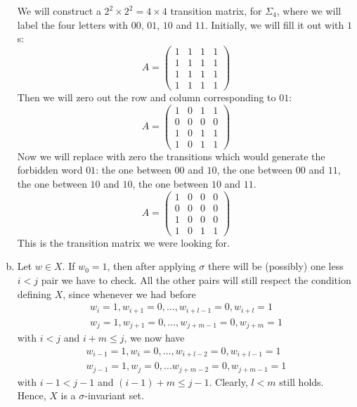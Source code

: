 \begin{problem}
\begin{enumerate}[a)]
    We will construct a \(2^2 \times 2^2 = 4 \times 4\) transition matrix, for \(\Sigma_4\), where we will label the four letters with \(00\), \(01\), \(10\) and \(11\). Initially, we will fill it out with \(1\)s:
    \[
        A = \begin{pmatrix}
            1 & 1 & 1 & 1 \\
            1 & 1 & 1 & 1 \\
            1 & 1 & 1 & 1 \\
            1 & 1 & 1 & 1
        \end{pmatrix}
    \]
    Then we will zero out the row and column corresponding to \(01\):
    \[
        A = \begin{pmatrix}
            1 & 0 & 1 & 1 \\
            0 & 0 & 0 & 0 \\
            1 & 0 & 1 & 1 \\
            1 & 0 & 1 & 1
        \end{pmatrix}
    \]
    Now we will replace with zero the transitions which would generate the forbidden word \(01\): the one between \(00\) and \(10\), the one between \(00\) and \(11\), the one between \(10\) and \(10\), the one between \(10\) and \(11\).
    \[
        A = \begin{pmatrix}
            1 & 0 & 0 & 0 \\
            0 & 0 & 0 & 0 \\
            1 & 0 & 0 & 0 \\
            1 & 0 & 1 & 1
        \end{pmatrix}
    \]
    This is the transition matrix we were looking for.

    \item Let \(w \in X\). If \(w_0 = 1\), then after applying \(\sigma\) there will be (possibly) one less \(i < j\) pair we have to check. All the other pairs will still respect the condition defining \(X\), since whenever we had before
    \begin{gather*}
        w_{i} = 1, w_{i+1} = 0, \dots, w_{i+l-1} = 0, w_{i+l} = 1 \\
        w_{j} = 1, w_{j+1}= 0, \dots, w_{j+m-1} = 0, w_{j+m} = 1
    \end{gather*}
    with \(i < j\) and \(i + m \leq j\), we now have
    \begin{gather*}
        w_{i - 1} = 1, w_{i} = 0, \dots, w_{i+l-2} = 0, w_{i+l-1} = 1 \\
        w_{j-1} = 1, w_{j} = 0, \dots w_{j+m-2} = 0, w_{j+m-1} = 1
    \end{gather*}
    with \(i - 1 < j - 1\) and \((i - 1) + m \leq j - 1\). Clearly, \(l < m\) still holds. Hence, \(X\) is a \(\sigma\)-invariant set.


\end{enumerate}
\end{problem}
